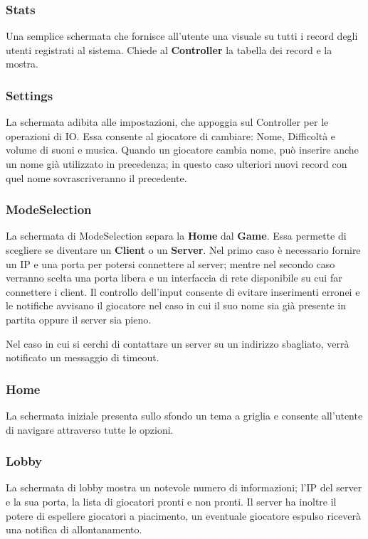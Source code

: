     \subsubsection{Stats}
        Una semplice schermata che fornisce all'utente una visuale su tutti i record degli utenti registrati al sistema.
        Chiede al \textbf{Controller} la tabella dei record e la mostra.


    \subsubsection{Settings}
        La schermata adibita alle impostazioni, che appoggia sul Controller per le operazioni di IO. Essa consente al giocatore di cambiare: Nome, Difficoltà e volume di suoni e musica.
        Quando un giocatore cambia nome, può inserire anche un nome già utilizzato in precedenza; in questo caso ulteriori nuovi 
        record con quel nome sovrascriveranno il precedente.

  \subsubsection{ModeSelection}
        La schermata di ModeSelection separa la \textbf{Home} dal \textbf{Game}.
        Essa permette di scegliere se diventare un \textbf{Client} o un \textbf{Server}. Nel primo caso è necessario fornire un IP e una porta per potersi connettere al server; mentre nel secondo caso verranno scelta una porta libera e un interfaccia di rete disponibile su cui far connettere i client.
        Il controllo dell'input consente di evitare inserimenti erronei e le notifiche avvisano il giocatore nel caso in cui il suo nome sia già presente in partita oppure il server sia pieno.
        
        Nel caso in cui si cerchi di contattare un server su un indirizzo sbagliato, verrà notificato un messaggio di timeout.
        
    \subsubsection{Home}
        La schermata iniziale presenta sullo sfondo un tema a griglia e consente all'utente di navigare attraverso tutte le opzioni.
    
    \subsubsection{Lobby}
        La schermata di lobby mostra un notevole numero di informazioni; l'IP del server e la sua porta, la lista di giocatori pronti e non pronti.
        Il server ha inoltre il potere di espellere giocatori a piacimento, un eventuale giocatore espulso riceverà una notifica di allontanamento.
        
